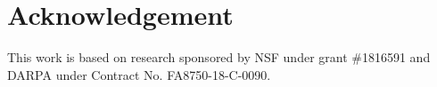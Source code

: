 \documentclass[letterpaper, 10 pt, conference]{ieeeconf}  %
\begin{document}
\section{Acknowledgement}
This work is based on research sponsored by NSF under grant \#1816591 and DARPA under Contract No. FA8750-18-C-0090.









\end{document}
